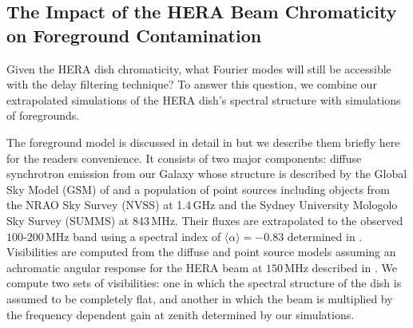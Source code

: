\documentclass[twocolumn]{emulateapj}
\begin{document}
\subsection{The Impact of the HERA Beam Chromaticity on Foreground Contamination}\label{ssec:Leakage}

Given the HERA dish chromaticity, what Fourier modes will still be accessible with the delay filtering technique? To answer this question, we combine our extrapolated simulations of the HERA dish's spectral structure with simulations of foregrounds. 

The foreground model is discussed in detail in \citet{Thyagarajan:2016} but we describe them briefly here for the readers convenience. It consists of two major components: diffuse synchrotron emission from our Galaxy whose structure is described by the Global Sky Model (GSM) of \citet{deOliveiraCosta:2008} and a population of point sources including objects from the NRAO Sky Survey (NVSS) \citep{Condon:1998} at 1.4\,GHz and the Sydney University Mologolo Sky Survey (SUMMS) \citep{Bock:1999} at 843\,MHz. Their fluxes are extrapolated to the observed $100$-$200$\,MHz band using a spectral index of $\langle \alpha \rangle=-0.83$ determined in \citet{Mauch:2003}. Visibilities are computed from the diffuse and point source models assuming an achromatic angular response for the HERA beam at $150$\,MHz described in \citet{Neben:2016}. We compute two sets of visibilities: one in which the spectral structure of the dish is assumed to be completely flat, and another in which the beam is multiplied by the frequency dependent gain at zenith determined by our simulations.  
\end{document}
